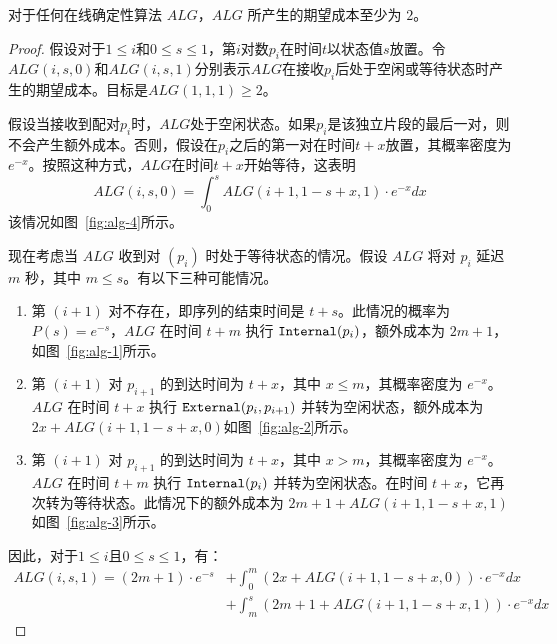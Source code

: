 \begin{lemma} \label{lemma:alg_cost}
对于任何在线确定性算法 $ALG$，$ALG$ 所产生的期望成本至少为 $2$。    
\end{lemma}
\begin{proof}
假设对于$1\leq i$和$0\leq s\leq 1$，第$i$对数$p_i$在时间$t$以状态值$s$放置。令$ALG(i,s,0)$和$ALG(i,s,1)$分别表示$ALG$在接收$p_i$后处于空闲或等待状态时产生的期望成本。目标是$ALG(1,1,1)\ge 2$。

假设当接收到配对$p_i$时，$ALG$处于空闲状态。如果$p_i$是该独立片段的最后一对，则不会产生额外成本。否则，假设在$p_i$之后的第一对在时间$t+x$放置，其概率密度为$e^{-x}$。按照这种方式，$ALG$在时间$t+x$开始等待，这表明
$$ALG(i,s,0)=\int_{0}^{s}ALG(i+1,1-s+x,1)\cdot e^{-x}dx$$ 该情况如图~\ref{fig:alg-4}所示。

现在考虑当 $ALG$ 收到对 $(p_i)$ 时处于等待状态的情况。假设 $ALG$ 将对 $p_i$ 延迟 $m$ 秒，其中 $m\leq s$。有以下三种可能情况。

\renewcommand{\labelenumi}{(\arabic{enumi})}
\begin{enumerate}[align=left, labelsep=0.5em, itemindent=2.5em, leftmargin=0em]
    \item 第 $(i+1)$ 对不存在，即序列的结束时间是 $t+s$。此情况的概率为 $P(s)=e^{-s}$，$ALG$ 在时间 $t+m$ 执行 $\Inter(p_i)$，额外成本为 $2m+1$，如图~\ref{fig:alg-1}所示。
    \item 第 $(i+1)$ 对 $p_{i+1}$ 的到达时间为 $t+x$，其中 $x\leq m$，其概率密度为 $e^{-x}$。$ALG$ 在时间 $t+x$ 执行 $\Exter(p_i,p_{i+1})$ 并转为空闲状态，额外成本为 $2x+ALG(i+1,1-s+x,0)$如图~\ref{fig:alg-2}所示。
    \item 第 $(i+1)$ 对 $p_{i+1}$ 的到达时间为 $t+x$，其中 $x>m$，其概率密度为 $e^{-x}$。$ALG$ 在时间 $t+m$ 执行 $\Inter(p_i)$ 并转为空闲状态。在时间 $t+x$，它再次转为等待状态。此情况下的额外成本为 $2m+1+ALG(i+1,1-s+x,1)$如图~\ref{fig:alg-3}所示。
\end{enumerate}

因此，对于$1\leq i$且$0\leq s\leq 1$，有：
\begin{align*}
ALG(i,s,1)=(2m+1)\cdot e^{-s} & +\int_{0}^{m}(2x+ALG(i+1,1-s+x,0))\cdot e^{-x}dx \\
& + \int_{m}^{s}(2m+1+ALG(i+1,1-s+x,1))\cdot e^{-x}dx
\end{align*}



\end{proof}
